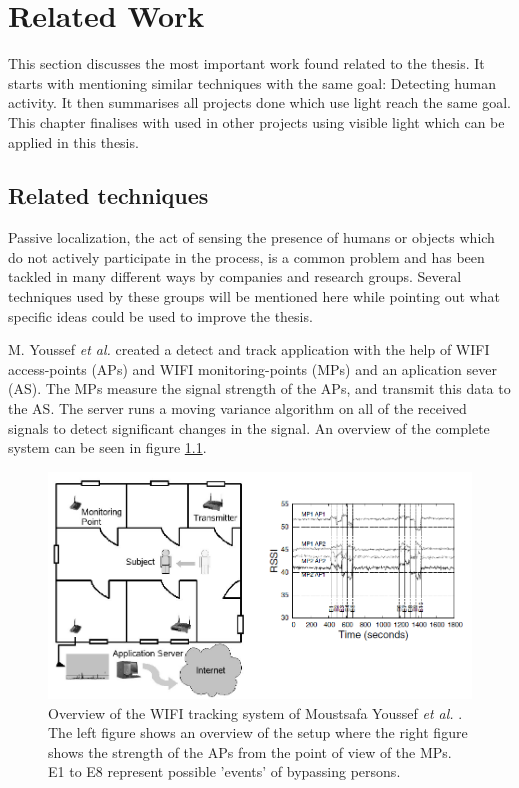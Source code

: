 \chapter{Related Work}
\label{Related Work}
This section discusses the most important work found related to the thesis. It starts with mentioning similar techniques with the same goal: Detecting human activity. It then summarises all projects done which use light reach the same goal. This chapter finalises with used in other projects using visible light which can be applied in this thesis.

\section{Related techniques}
Passive localization, the act of sensing the presence of humans or objects which do not actively participate in the process, is a common problem and has been tackled in many different ways by companies and research groups. Several techniques used by these groups will be mentioned here while pointing out what specific ideas could be used to improve the thesis.

M. Youssef \textit{et al.} created a detect and track application with the help of WIFI access-points (APs) and WIFI monitoring-points (MPs) and an aplication sever (AS)\cite{WIFI_Tracking}. The MPs measure the signal strength of the APs, and transmit this data to the AS. The server runs a moving variance algorithm on all of the received signals to detect significant changes in the signal. An overview of the complete system can be seen in figure \ref{fig:WIFI-tracking}.

\begin{figure}[]
	\centering
	\label{fig:WIFI-tracking}
	\includegraphics[width=\textwidth]{pics/MovingVarriance1.png}
	\caption{Overview of the WIFI tracking system of Moustsafa Youssef \textit{et al.} \cite{WIFI_Tracking}. The left figure shows an overview of the setup where the right figure shows the strength of the APs from the point of view of the MPs. E1 to E8 represent possible 'events' of bypassing persons.}
\end{figure}

